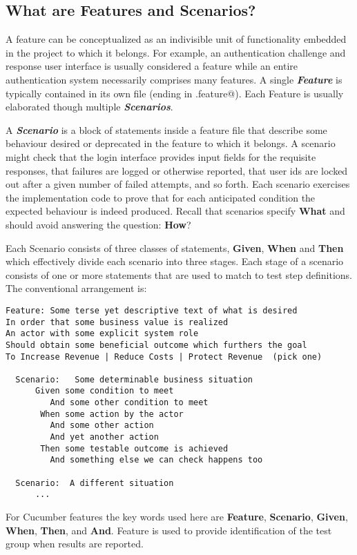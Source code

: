 \subsection{What are Features and Scenarios?}

A feature can be conceptualized as an indivisible unit of functionality embedded in the project to which it belongs.  For example, an authentication challenge and response user interface is usually considered a feature while an entire authentication system necessarily comprises many features.   A single \textbf{\emph{Feature}} is typically contained in its own file (ending in \verb@.feature@).  Each Feature is usually elaborated though multiple \textbf{\emph{Scenarios}}.

A \textbf{\emph{Scenario}} is a block of statements inside a feature file that describe some behaviour desired or deprecated in the feature to which it belongs.  A scenario might check that the login interface provides input fields for the requisite responses, that failures are logged or otherwise reported, that user ids are locked out after a given number of failed attempts, and so forth.  Each scenario exercises the implementation code to prove that for each anticipated condition the expected behaviour is indeed produced.  Recall that scenarios specify \textbf{What} and should avoid answering the question: \textbf{How}?

Each Scenario consists of three classes of statements, \textbf{Given}, \textbf{When} and \textbf{Then} which effectively divide each scenario into three stages.  Each stage of a scenario consists of one or more statements that are used to match to test step definitions. The conventional arrangement is:

\begin{verbatim}
Feature: Some terse yet descriptive text of what is desired
In order that some business value is realized
An actor with some explicit system role
Should obtain some beneficial outcome which furthers the goal
To Increase Revenue | Reduce Costs | Protect Revenue  (pick one)

  Scenario:   Some determinable business situation
      Given some condition to meet
         And some other condition to meet
       When some action by the actor
         And some other action
         And yet another action
       Then some testable outcome is achieved
         And something else we can check happens too

  Scenario:  A different situation
      ...

\end{verbatim}
For Cucumber features the key words used here are \textbf{Feature}, \textbf{Scenario}, \textbf{Given}, \textbf{When}, \textbf{Then}, and \textbf{And}.  Feature is used to provide identification of the test group when results are reported.

